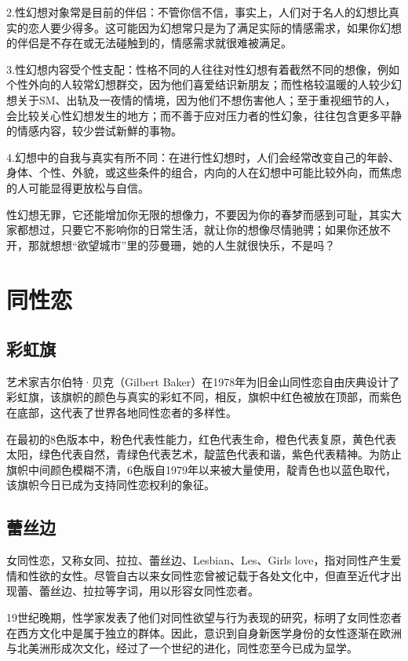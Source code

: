 \documentclass[12pt,UTF8]{ctexbook}
\begin{document}
2.性幻想对象常是目前的伴侣：不管你信不信，事实上，人们对于名人的幻想比真实的恋人要少得多。这可能因为幻想常只是为了满足实际的情感需求，如果你幻想的伴侣是不存在或无法碰触到的，情感需求就很难被满足。

3.性幻想内容受个性支配：性格不同的人往往对性幻想有着截然不同的想像，例如个性外向的人较常幻想群交，因为他们喜爱结识新朋友；而性格较温暖的人较少幻想关于SM、出轨及一夜情的情境，因为他们不想伤害他人；至于重视细节的人，会比较关心性幻想发生的地方；而不善于应对压力者的性幻象，往往包含更多平静的情感内容，较少尝试新鮮的事物。

4.幻想中的自我与真实有所不同：在进行性幻想时，人们会经常改变自己的年龄、身体、个性、外貌，或这些条件的组合，内向的人在幻想中可能比较外向，而焦虑的人可能显得更放松与自信。

性幻想无罪，它还能增加你无限的想像力，不要因为你的春梦而感到可耻，其实大家都想过，只要它不影响你的日常生活，就让你的想像尽情驰骋；如果你还放不开，那就想想“欲望城市”里的莎曼珊，她的人生就很快乐，不是吗？

\chapter{同性恋}

\section{彩虹旗}

艺术家吉尔伯特·贝克（Gilbert Baker）在1978年为旧金山同性恋自由庆典设计了彩虹旗，该旗帜的颜色与真实的彩虹不同，相反，旗帜中红色被放在顶部，而紫色在底部，这代表了世界各地同性恋者的多样性。

在最初的8色版本中，粉色代表性能力，红色代表生命，橙色代表复原，黄色代表太阳，绿色代表自然，青绿色代表艺术，靛蓝色代表和谐，紫色代表精神。为防止旗帜中间颜色模糊不清，6色版自1979年以来被大量使用，靛青色也以蓝色取代，该旗帜今日已成为支持同性恋权利的象征。

\section{蕾丝边}

女同性恋，又称女同、拉拉、蕾丝边、Lesbian、Les、Girls love，指对同性产生爱情和性欲的女性。尽管自古以来女同性恋曾被记载于各处文化中，但直至近代才出现蕾、蕾丝边、拉拉等字词，用以形容女同性恋者。

19世纪晚期，性学家发表了他们对同性欲望与行为表现的研究，标明了女同性恋者在西方文化中是属于独立的群体。因此，意识到自身新医学身份的女性逐渐在欧洲与北美洲形成次文化，经过了一个世纪的进化，同性恋至今已成为显学。
\end{document}
